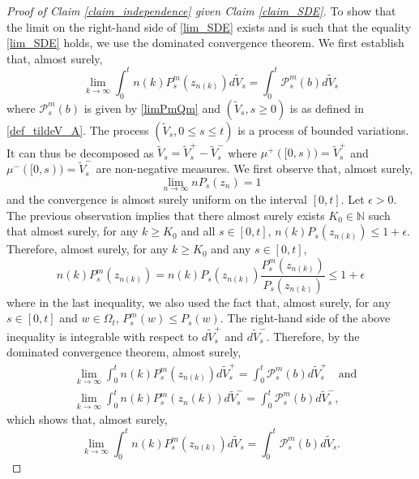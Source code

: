 \documentclass{article}
\newcommand{\eps}{{\epsilon}}
\theoremstyle{definition}
\theoremstyle{remark}
\theoremstyle{remark}
\begin{document}
\begin{proof}[Proof of Claim \ref{claim_independence} given Claim \ref{claim_SDE}]
To show that the limit on the right-hand side of \eqref{lim_SDE} exists and is such that the equality \eqref{lim_SDE} holds, we use the dominated convergence theorem. We first establish that, almost surely,
\begin{equation*}
    \lim_{k \to \infty} \int_{0}^{t} n(k)P_s^m(z_{n(k)}) d\tilde V_s = \int_{0}^{t} \mathcal{P}_s^m(b) d\tilde V_s
\end{equation*}
where $\mathcal{P}_s^m(b)$ is given by \eqref{limPmQm} and $(\tilde V_s, s \geq 0)$ is as defined in \eqref{def_tildeV_A}. The process $(\tilde V_s, 0 \leq s \leq t)$ is a process of bounded variations. It can thus be decomposed as $\tilde V_s = \tilde V_s^{+} - \tilde V_s^{-}$ where $\mu^{+}([0,s)) = \tilde V_s^{+}$ and $\mu^{-}([0,s)) = \tilde V_s^{-}$ are non-negative measures. We first observe that, almost surely,
\begin{equation} \label{cvg_P0n}
    \lim_{n \to \infty} nP_s(z_n) = 1
\end{equation}
and the convergence is almost surely uniform on the interval $[0,t]$. Let $\epsilon > 0$. The previous observation implies that there almost surely exists $K_0 \in \mathbb{N}$ such that almost surely, for any $k \geq K_0$ and all $s \in [0,t]$, $n(k)P_s(z_{n(k)}) \leq 1 +\eps$. Therefore, almost surely, for any $k \geq K_0$ and any $s \in [0,t]$,
\begin{equation*}
    n(k)P_{s}^m(z_{n(k)}) = n(k)P_{s}(z_{n(k)})\frac{P_{s}^m(z_{n(k)})}{P_{s}(z_{n(k)})} \leq 1 +\eps
\end{equation*}
where in the last inequality, we also used the fact that, almost surely, for any $s \in [0,t]$ and $w \in \Omega_t$, $P_s^m(w) \leq P_s(w)$. The right-hand side of the above inequality is integrable with respect to $d\tilde V_s^{+}$ and $d\tilde V_s^{-}$. Therefore, by the dominated convergence theorem, almost surely,
\begin{align*}
    & \lim_{k \to \infty} \int_{0}^{t}  n(k)P_{s}^m(z_{n(k)}) d\tilde V_s^{+} = \int_{0}^{t} \mathcal{P}_s^{m}(b) d\tilde V_s^{+} \quad \text{and}\\
    & \lim_{k \to \infty} \int_{0}^{t}  n(k)P_{s}^m(z_n(k)) d\tilde V_s^{-} = \int_{0}^{t} \mathcal{P}_s^{m}(b) d\tilde V_s^{-},
\end{align*}
which shows that, almost surely,
\begin{equation*}
    \lim_{k \to \infty} \int_{0}^{t}  n(k)P_{s}^m(z_{n(k)}) d\tilde V_s = \int_{0}^{t} \mathcal{P}_s^{m}(b) d\tilde V_s.
\end{equation*}

\end{proof}
\end{document}
